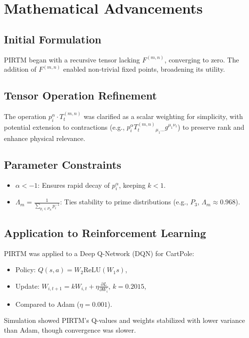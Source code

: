 \documentclass{article}
\theoremstyle{plain}
\begin{document}
\section{Mathematical Advancements}
\subsection{Initial Formulation}
PIRTM began with a recursive tensor lacking \( F^{(m,n)} \), converging to zero. The addition of \( F^{(m,n)} \) enabled non-trivial fixed points, broadening its utility.

\subsection{Tensor Operation Refinement}
The operation \( p_i^\alpha \cdot T_t^{(m,n)} \) was clarified as a scalar weighting for simplicity, with potential extension to contractions (e.g., \( p_i^\alpha T_t^{(m,n)}{}_{\mu_1 \dots} g^{\mu_1 \nu_1} \)) to preserve rank and enhance physical relevance.

\subsection{Parameter Constraints}
\begin{itemize}
    \item \( \alpha < -1 \): Ensures rapid decay of \( p_i^\alpha \), keeping \( k < 1 \).
    \item \( \Lambda_m = \frac{1}{\sum_{p_i \in P_N} p_i^{-1}} \): Ties stability to prime distributions (e.g., \( P_3 \), \( \Lambda_m \approx 0.968 \)).
\end{itemize}

\subsection{Application to Reinforcement Learning}
PIRTM was applied to a Deep Q-Network (DQN) for CartPole:
\begin{itemize}
    \item Policy: \( Q(s, a) = W_2 \text{ReLU}(W_1 s) \),
    \item Update: \( W_{i,t+1} = k W_{i,t} + \eta \frac{\partial L}{\partial W_i} \), \( k = 0.2015 \),
    \item Compared to Adam (\( \eta = 0.001 \)).
\end{itemize}
Simulation showed PIRTM’s Q-values and weights stabilized with lower variance than Adam, though convergence was slower.
\end{document}

